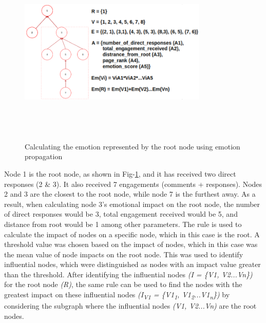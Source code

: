 \documentclass[acmtog]{acmart}
\begin{document}
\begin{figure}[h]
  
    \centering
    \includegraphics[width=9cm,height=9cm,keepaspectratio]{iimp_desc.png}
  \caption{Calculating the emotion represented by the root node using emotion propagation}
  \label{fig:desc}
  \end{figure}
Node 1 is the root node, as shown in Fig-\ref{fig:desc}, and it has received two direct responses (2 \& 3). It also received 7 engagements (comments + responses). Nodes 2 and 3 are the closest to the root node, while node 7 is the furthest away. As a result, when calculating node 3's emotional impact on the root node, the number of direct responses would be 3, total engagement received would be 5, and distance from root would be 1 among other parameters. The rule is used to calculate the impact of nodes on a specific node, which in this case is the root. A threshold value was chosen based on the impact of nodes, which in this case was the mean value of node impacts on the root node. This was used to identify influential nodes, which were distinguished as nodes with an impact value greater than the threshold. After identifying the influential nodes \textit{(I = \{V1, V2...Vn\})} for the root node \textit{(R)}, the same rule can be used to find the nodes with the greatest impact on these influential nodes  \textit{(I\textsubscript{V1} = \{V1\textsubscript{1}, V1\textsubscript{2}...V1\textsubscript{n}\})} by considering the subgraph where the influential nodes \textit{(V1, V2...Vn)} are the root nodes.
\end{document}

